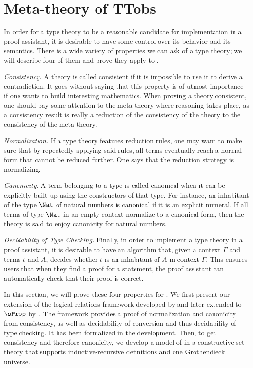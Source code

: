 \setchapterpreamble[u]{\margintoc}
\chapter{Meta-theory of TTobs}

In order for a type theory to be a reasonable candidate for implementation in a proof assistant,
it is desirable to have some control over its behavior and its semantics. There is a wide variety
of properties we can ask of a type theory; we will describe four of them and prove they apply to
\SetoidTT.

{\em Consistency.}
A theory is called consistent if it is impossible to use it to derive a contradiction. It goes
without saying that this property is of utmost importance if one wants to build interesting
mathematics. When proving a theory consistent, one should pay some attention to the meta-theory
where reasoning takes place, as a consistency result is really a reduction of the consistency of
the theory to the consistency of the meta-theory.

{\em Normalization.}
If a type theory features reduction rules, one may want to make sure that by repeatedly applying
said rules, all terms eventually reach a normal form that cannot be reduced further.
One says that the reduction strategy is normalizing.
%

{\em Canonicity.}
A term belonging to a type is called canonical when it can be explicitly built up
using the constructors of that type. For instance, an inhabitant of the type \( \Nat \) of natural
numbers is canonical if it is an explicit numeral. If all terms of type \( \Nat \) in an empty
context normalize to a canonical form, then the theory is said to enjoy canonicity for natural
numbers.

{\em Decidability of Type Checking.}
Finally, in order to implement a type theory in a proof assistant, it is desirable to have an
algorithm that, given a context \( \Gamma \) and terms \( t \) and \( A \), decides whether \( t \)
is an inhabitant of \( A \) in context \( \Gamma \). This ensures users that when they find a
proof for a statement, the proof assistant can automatically check that their proof is correct.

In this section, we will prove these four properties for \SetoidTT.
%
We first present our extension of the
logical relations framework developed by  and
later extended to $\sProp$ by~. The
framework provides a proof of normalization and canonicity from
consistency, as well as decidability of conversion and thus decidability of
type checking.
%
It has been formalized in the \Agda development.
%
Then, to get consistency and therefore canonicity, we develop a model of
\SetoidTT in a constructive set theory that supports inductive-recursive definitions and one
Grothendieck universe.


